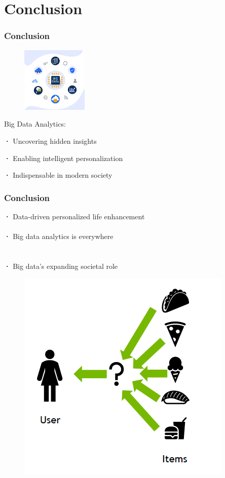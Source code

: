 \documentclass{beamer}
\begin{document}
\section{Conclusion}
\begin{frame}
  \frametitle{Conclusion}

  \begin{figure}
    \includegraphics[width=0.28\textwidth]{figure 2.png}
    \label{fig:bigdata_conclusion}
  \end{figure}

  {\Large Big Data Analytics:}
  
  \vspace{2 em}
  
  {\Large \textbf{·} Uncovering hidden insights}
  
  \vspace{1 em}
  
  {\Large \textbf{·} Enabling intelligent personalization}
  
  \vspace{1.75 em}
  
  {\Large \textbf{·} Indispensable in modern society}

\end{frame}


\begin{frame}
 \frametitle{Conclusion}
\begin{minipage}{\textwidth}
{\Large \textbf{·} Data-driven personalized life enhancement}\\
\\{\Large \textbf{·} Big data analytics is everywhere}\\
\\
\\{\Large \textbf{·} Big data's expanding societal role}
\begin{figure}
    \centering
    \includegraphics[width=0.35\linewidth]{figure 3.png}
    \label{fig:enter-label}
\end{figure}
\end{minipage}
\end{frame}
\end{document}

